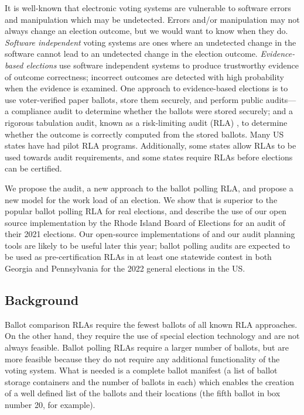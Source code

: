 It is well-known that electronic voting systems are vulnerable to software errors and manipulation which may be undetected. Errors and/or manipulation may not always change an election outcome, but we would want to know when they do. {\em Software independent} voting systems \cite{SI-Wack,rivest2008notion} are ones where an undetected change in the software cannot lead to an undetected change in the election outcome. {\em Evidence-based elections} \cite{evidence-based} use software independent systems to produce trustworthy evidence of outcome correctness; incorrect outcomes are detected with high probability when the evidence is examined. One approach to evidence-based elections is to use voter-verified paper ballots, store them securely, and perform public audits---a compliance audit to determine whether the ballots were stored securely; and a rigorous tabulation audit, known as a risk-limiting audit (RLA) \cite{RLA}, to determine whether the outcome is correctly computed from the stored ballots. Many US states have had pilot RLA programs. Additionally, some states allow RLAs to be used towards audit requirements, and some states require RLAs before elections can be certified. 

We propose the \Providence audit, a new approach to the ballot polling RLA, and propose a new model for the work load of an election. We show that \Providence is superior to the popular ballot polling RLA \Bravo for real elections, and describe the use of our open source implementation by the Rhode Island Board of Elections for an audit of their 2021 elections. Our open-source implementations of \Providence and our audit planning tools are likely to be useful later this year; ballot polling audits are expected to be used as pre-certification RLAs in at least one statewide contest in both Georgia and Pennsylvania for the 2022 general elections in the US.   

\subsection{Background}
Ballot comparison RLAs require the fewest ballots of all known RLA approaches. On the other hand, they require the use of special election technology and are not always feasible. Ballot polling RLAs require a larger number of ballots, but are more feasible because they do not require any additional functionality of the voting system. What is needed is a complete ballot manifest (a list of ballot storage containers and the number of ballots in each) which enables the creation of a well defined list of the ballots and their locations (the fifth ballot in box number 20, for example). 

